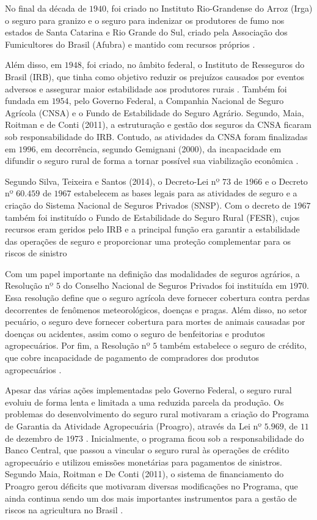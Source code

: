 \documentclass[
	12pt,				%
	openright,			%
	oneside,			%
	a4paper,			%
	chapter=TITLE,		%
	section=TITLE,		%
	english,			%
	french,				%
	spanish,			%
	brazil				%
	]{abntex2}
\begin{document}
No final da década de $1940$, foi criado no Instituto Rio-Grandense do Arroz (Irga) o seguro para granizo e o seguro para indenizar os produtores de fumo nos estados de Santa Catarina e Rio Grande do Sul, criado pela Associação dos Fumicultores do Brasil (Afubra) e mantido com recursos próprios \cite{silva14}. 

Além disso, em $1948$, foi criado, no âmbito federal, o Instituto de  Resseguros do Brasil (IRB), que tinha como objetivo reduzir os prejuízos causados por eventos adversos e assegurar maior estabilidade aos produtores rurais \cite{silva14}. Também foi fundada em $1954$, pelo Governo Federal, a Companhia Nacional de Seguro Agrícola (CNSA) e o Fundo de Estabilidade do Seguro Agrário. Segundo, Maia,  Roitman e de Conti (2011), a estruturação e gestão dos seguros da CNSA ficaram sob responsabilidade do IRB. Contudo, as atividades da CNSA foram finalizadas em $1996$, em decorrência, segundo Gemignani (2000), da incapacidade em difundir o seguro rural de forma a tornar possível sua viabilização econômica \cite{maia11, silva14}.

Segundo Silva, Teixeira e Santos (2014), o Decreto-Lei nº $73$ de $1966$ e o Decreto nº $60.459$ de $1967$ estabelecem as bases legais para as atividades de seguro e a criação do Sistema Nacional de Seguros Privados (SNSP). Com o decreto de $1967$ também foi instituído o Fundo de Estabilidade do Seguro Rural (FESR), cujos recursos eram geridos pelo IRB e a principal função era garantir a estabilidade das operações de seguro e proporcionar uma proteção complementar para os riscos de sinistro \cite{silva14}

Com um papel importante na definição das modalidades de seguros agrários, a Resolução nº $5$ do Conselho Nacional de Seguros Privados foi instituída em $1970$. Essa resolução define que o seguro agrícola deve fornecer cobertura contra perdas decorrentes de fenômenos meteorológicos, doenças e pragas. Além disso, no setor pecuário, o seguro deve fornecer cobertura para mortes de animais causadas por doenças ou acidentes, assim como o seguro de benfeitorias e produtos agropecuários. Por fim, a Resolução nº $5$ também estabelece o seguro de crédito, que cobre incapacidade de pagamento de compradores dos produtos agropecuários \cite{silva14}.

Apesar das várias ações implementadas pelo Governo Federal, o seguro rural evoluiu de forma lenta e limitada a uma reduzida parcela da produção. Os problemas do desenvolvimento do seguro rural  motivaram a criação do Programa de Garantia da Atividade Agropecuária (Proagro), através da Lei nº $5.969$, de $11$ de dezembro de $1973$ \cite{silva14}. Inicialmente, o programa ficou sob a responsabilidade do Banco Central, que passou a vincular o seguro rural às operações de crédito agropecuário e utilizou emissões monetárias para pagamentos de sinistros. Segundo Maia, Roitman e De Conti (2011), o sistema de financiamento do Proagro gerou déficits que motivaram diversas modificações no Programa, que ainda continua sendo um dos mais importantes instrumentos para a gestão de riscos na agricultura no Brasil \cite{maia11}.
\end{document}
